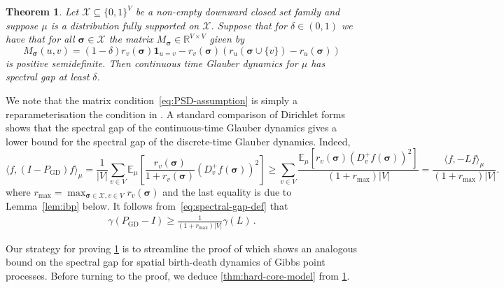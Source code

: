 \documentclass[10pt,a4paper]{amsart}
\newtheorem{theorem}{Theorem}[section]
\newcommand{\one}{\boldsymbol{1}}
\newcommand{\E}{\mathbb{E}}
\newcommand{\R}{\mathbb{R}}
\newcommand{\sigmabf}{ \boldsymbol{\sigma} }
\begin{document}
	\begin{theorem}\label{th:main}
		Let $\mathcal{X} \subseteq \{0,1\}^V$ be a non-empty downward closed set family and suppose $\mu$ is a distribution fully supported on $\mathcal{X}$.  Suppose that for $\delta \in (0,1)$ we have that for all $\sigmabf \in \mathcal{X}$ the matrix $M_{\sigmabf}\in \R^{V\times V}$ given by
		\begin{equation}\label{eq:PSD-assumption}
			M_{\sigmabf}(u,v)=(1 - \delta)r_v(\sigmabf)\one_{u = v} - r_v(\sigmabf)(r_u(\sigmabf\cup \{v\}) - r_u(\sigmabf))  
		\end{equation}
		is positive semidefinite. Then continuous time Glauber dynamics for $\mu$ has spectral gap at least $\delta$.
	\end{theorem}

	
	We note that the matrix condition~\eqref{eq:PSD-assumption} is simply a reparameterisation the condition in \cite[Thm.~1.9]{chen2025rapid}. A standard comparison of Dirichlet forms shows that the spectral gap of the continuous-time Glauber dynamics gives a lower bound for the spectral gap of the discrete-time Glauber dynamics. Indeed, 
	\[
	\langle f,(I-P_{\mathrm{GD}})f\rangle_\mu
	=
	\frac{1}{|V|}
	\sum_{v\in V}
	\E_\mu\left[\frac{r_v(\sigmabf)}{1+r_v(\sigmabf)}
	(D_v^+f(\sigmabf))^2\right] \geq \sum_{v\in V} \frac{
		\E_\mu\left[r_v(\sigmabf)
		(D_v^+f(\sigmabf))^2\right]}{(1+r_{\max})|V|} =  \frac{\langle f,-Lf\rangle_\mu}{(1+r_{\max})|V|} .
	\]
	where $r_{\max}=\max_{\sigmabf\in\mathcal X, v\in V} r_v(\sigmabf)$ and the last equality is due to Lemma~\ref{lem:ibp} below.  
	It follows from~\eqref{eq:spectral-gap-def} that  
	\begin{align}\label{eq:gapcomp}
		\gamma(P_{\mathrm{GD}}-I)
		\ge
		\frac{1}{(1+r_{\max})|V|}\gamma(L) \,.
	\end{align}
	
	
	
	
	
	Our strategy for proving \cref{th:main} is to streamline  the proof of \cite[Thm.~4.2]{kondratiev2013spectral} which shows an analogous bound on the spectral gap for spatial birth-death dynamics of Gibbs point processes. Before turning to the proof, we deduce \cref{thm:hard-core-model} from \cref{th:main}.
	
	
\end{document}

